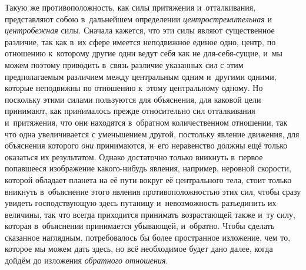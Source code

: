 Такую же противоположность, как силы притяжения и~отталкивания, представляют
собою в~дальнейшем определении {\em центростремительная} и
{\em центробежная} силы. Сначала кажется, что эти силы
являют существенное различие, так как в~их сфере имеется неподвижное единое
одно, центр, по отношению к~которому другие одни ведут себя как не
для-себя-сущие, и~мы можем поэтому приводить в~связь различие указанных сил
с этим предполагаемым различием между центральным одним и~другими одними,
которые неподвижны по отношению к~этому центральному одному. Но поскольку
этими силами пользуются для объяснения, для каковой цели принимают, как
принималось прежде относительно сил отталкивания и~притяжения, что они
находятся в~обратном количественном отношении, так что одна увеличивается с
уменьшением другой, постольку явление движения, для объяснения которого
{\em они} принимаются, и~его неравенство должны ещё
только оказаться их результатом. Однако достаточно только вникнуть в~первое
попавшееся изображение какого-нибудь явления, например, неровной скорости,
которой обладает планета на её пути вокруг её центрального тела, стоит
только вникнуть в~объяснение этого явления противоположностью этих сил,
чтобы сразу увидеть господствующую здесь путаницу и~невозможность
разъединить их величины, так что всегда приходится принимать возрастающей
также и~ту силу, которая в~объяснении принимается убывающей, и~обратно.
Чтобы сделать сказанное наглядным, потребовалось бы более пространное
изложение, чем то, которое мы можем дать здесь, но всё необходимое будет
дано далее, когда дойдём до изложения {\em обратного отношения}.

\bigskip
